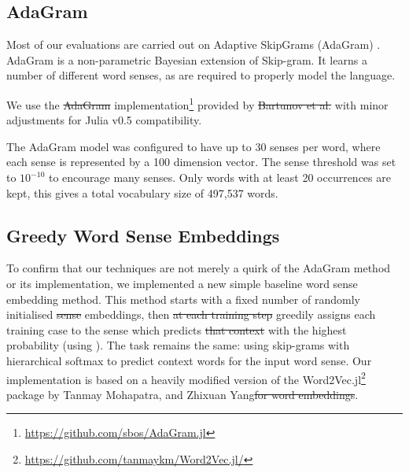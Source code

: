 \documentclass{article} %
\def\parencite{\cite} %
\providecommand{\DIFadd}[1]{{\protect\color{blue}\uwave{#1}}} %
\providecommand{\DIFdel}[1]{{\protect\color{red}\sout{#1}}}                      %
\providecommand{\DIFaddbegin}{} %
\providecommand{\DIFaddend}{} %
\providecommand{\DIFdelbegin}{} %
\providecommand{\DIFdelend}{} %
\begin{document}
\subsection{AdaGram}
Most of our evaluations are carried out on Adaptive SkipGrams (AdaGram) \parencite{AdaGrams}. AdaGram is a non-parametric Bayesian extension of Skip-gram. It learns a number of different word senses, as are required to properly model the language.

We use the \DIFdelbegin \DIFdel{AdaGram  }\DIFdelend implementation\footnote{\url{https://github.com/sbos/AdaGram.jl}} provided by \DIFdelbegin \DIFdel{Bartunov et al. }%
\DIFdelend \DIFaddbegin \DIFadd{the authors }\DIFaddend with minor adjustments for Julia \parencite{Julia} v0.5 compatibility.


The AdaGram model was configured to have up to 30 senses per word, where each sense is represented by a 100 dimension vector. 
The sense threshold was set to $10^{-10}$ to encourage many senses.
Only words with at least 20 occurrences are kept, this gives a total vocabulary size of 497,537 words.



\subsection{Greedy Word Sense Embeddings}

To confirm that our techniques are not merely a quirk of the AdaGram method or its implementation, we implemented a new simple baseline word sense embedding method.
This method starts with a fixed number of randomly initialised \DIFdelbegin \DIFdel{sense }\DIFdelend embeddings, then \DIFdelbegin \DIFdel{at each training step }\DIFdelend greedily assigns each training case to the sense which predicts \DIFdelbegin \DIFdel{that context }\DIFdelend \DIFaddbegin \DIFadd{it }\DIFaddend with the highest probability (using ). The task remains the same: using skip-grams with hierarchical softmax to predict \DIFaddbegin \DIFadd{the }\DIFaddend context words for the input word sense.
Our implementation is based on a heavily modified version of the Word2Vec.jl\footnote{\url{https://github.com/tanmaykm/Word2Vec.jl/}} package by Tanmay Mohapatra, and Zhixuan Yang\DIFdelbegin \DIFdel{for word embeddings}\DIFdelend .
\end{document}
